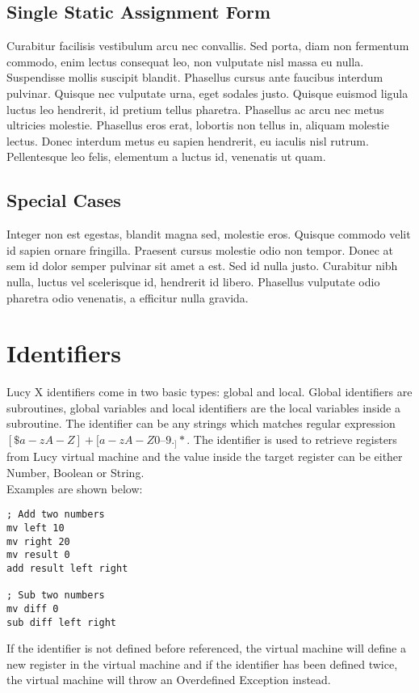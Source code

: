 \subsection{Single Static Assignment Form}
Curabitur facilisis vestibulum arcu nec convallis. Sed porta, diam non fermentum commodo, enim lectus consequat leo, non vulputate nisl massa eu nulla. Suspendisse mollis suscipit blandit. Phasellus cursus ante faucibus interdum pulvinar. Quisque nec vulputate urna, eget sodales justo. Quisque euismod ligula luctus leo hendrerit, id pretium tellus pharetra. Phasellus ac arcu nec metus ultricies molestie. Phasellus eros erat, lobortis non tellus in, aliquam molestie lectus. Donec interdum metus eu sapien hendrerit, eu iaculis nisl rutrum. Pellentesque leo felis, elementum a luctus id, venenatis ut quam.

\subsection{Special Cases}
Integer non est egestas, blandit magna sed, molestie eros. Quisque commodo velit id sapien ornare fringilla. Praesent cursus molestie odio non tempor. Donec at sem id dolor semper pulvinar sit amet a est. Sed id nulla justo. Curabitur nibh nulla, luctus vel scelerisque id, hendrerit id libero. Phasellus vulputate odio pharetra odio venenatis, a efficitur nulla gravida.


\section{Identifiers}
Lucy X identifiers come in two basic types: global and local. Global identifiers are subroutines, global variables and local identifiers are the local variables inside a subroutine. The identifier can be any strings which matches regular expression $[\$a-zA-Z]+[a-zA-Z0–9._]*$. The identifier is used to retrieve registers from Lucy virtual machine and the value inside the target register can be either Number, Boolean or String. \\
Examples are shown below:
\begin{lstlisting}[language=LucyX]
; Add two numbers
mv left 10
mv right 20
mv result 0
add result left right

; Sub two numbers
mv diff 0
sub diff left right
\end{lstlisting}
If the identifier is not defined before referenced, the virtual machine will define a new register in the virtual machine and if the identifier has been defined twice, the virtual machine will throw an Overdefined Exception instead.



